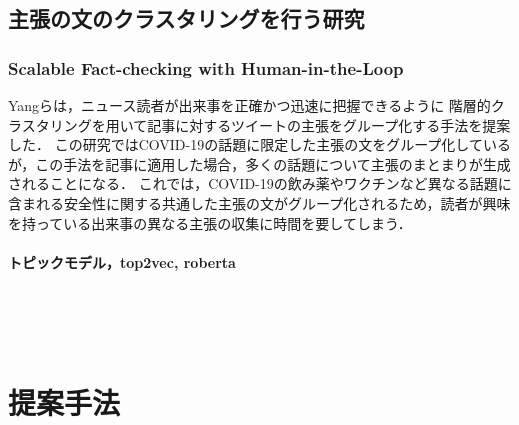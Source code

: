 \documentclass[12pt,a4j]{jreport}
\begin{document}
\section{主張の文のクラスタリングを行う研究}

\subsection{Scalable Fact-checking with Human-in-the-Loop}

Yangらは，ニュース読者が出来事を正確かつ迅速に把握できるように
階層的クラスタリングを用いて記事に対するツイートの主張をグループ化する手法を提案した\cite{yang_scalable_2021}．
この研究ではCOVID-19の話題に限定した主張の文をグループ化しているが，この手法を記事に適用した場合，多くの話題について主張のまとまりが生成されることになる．
これでは，COVID-19の飲み薬やワクチンなど異なる話題に含まれる安全性に関する共通した主張の文がグループ化されるため，読者が興味を持っている出来事の異なる主張の収集に時間を要してしまう．



\subsubsection{トピックモデル，top2vec, roberta}
~

~


\chapter{提案手法}
\label{chapter_method}
\end{document}
